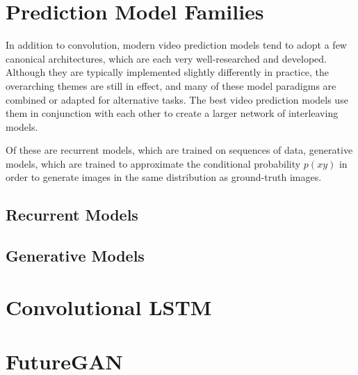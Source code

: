 \documentclass{scrartcl}
\begin{document}

\section{Prediction Model Families}
\label{sec:families}

In addition to convolution, modern video prediction models tend to adopt a few
canonical architectures, which are each very well-researched and developed.
Although they are typically implemented slightly differently in practice, the
overarching themes are still in effect, and many of these model paradigms are
combined or adapted for alternative tasks. The best video prediction models use
them in conjunction with each other to create a larger network of interleaving
models. 

Of these are recurrent models, which are trained on sequences of data,
generative models, which are trained to approximate the conditional probability
$p(x y)$ in order to generate images in the same distribution as ground-truth
images.

\subsection{Recurrent Models}
\label{subsec:recurrent}

\subsection{Generative Models}
\label{subsec:generative}

\section{Convolutional LSTM}
\label{sec:conv_lstm}

\section{FutureGAN}
\label{sec:futuregan}
\end{document}
